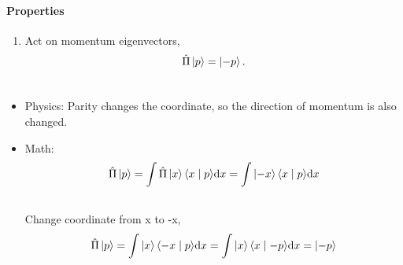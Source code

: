 \documentclass[letterpaper,10pt,english]{sphinxmanual}
\begin{document}
\paragraph{Properties}
\label{QuantumMechanics:properties}\begin{enumerate}
\item {} 
Act on momentum eigenvectors,
\begin{gather}
\begin{split}\hat \Pi \left| p\right\rangle = \left| -p\right\rangle .\end{split}\notag\\\begin{split}\end{split}\notag
\end{gather}
\end{enumerate}
\begin{itemize}
\item {} 
Physics: Parity changes the coordinate, so the direction of momentum is also changed.

\item {} 
Math:
\begin{gather}
\begin{split}\hat \Pi \left| p\right\rangle = \int \hat \Pi \left| x\right\rangle\langle x \mid p \rangle\mathrm{d} x= \int \left| -x\right\rangle\langle x \mid p \rangle\mathrm{d} x\end{split}\notag\\\begin{split}\end{split}\notag
\end{gather}
Change coordinate from x to -x,
\begin{gather}
\begin{split}\hat \Pi \left| p\right\rangle = \int \left| x\right\rangle\langle -x \mid p \rangle\mathrm{d} x = \int \left| x\right\rangle\langle x \mid -p \rangle\mathrm{d} x  = \left| -p\right\rangle\end{split}\notag\\\begin{split}\end{split}\notag
\end{gather}
\end{itemize}
\end{document}
